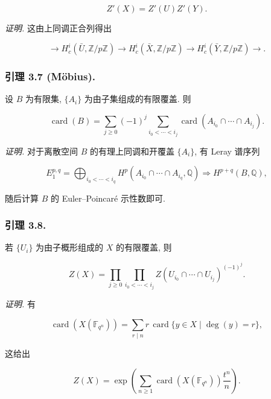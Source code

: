 \begin{equation}\tag{3.6.1}
Z'(X)=Z'(U)Z'(Y).
\end{equation}

\medskip
\noindent\emph{证明.}
这由上同调正合列得出

\begin{equation}\tag{3.6.2}
\longrightarrow H_c^i(\bar U,\mathbb Z/p\mathbb Z)
\longrightarrow H_c^i(\bar X,\mathbb Z/p\mathbb Z)
\longrightarrow H_c^i(\bar Y,\mathbb Z/p\mathbb Z)\longrightarrow.
\end{equation}

\subsubsection*{引理 3.7 (M\"obius).}
设 $B$ 为有限集, $\{A_i\}$ 为由子集组成的有限覆盖. 则

\begin{equation}\tag{3.7.1}
\operatorname{card}(B)=
\sum_{j\geq0}(-1)^j
\sum_{i_0<\cdots<i_j}
\operatorname{card}(A_{i_0}\cap\cdots\cap A_{i_j}).
\end{equation}

\medskip
\noindent\emph{证明.}
对于离散空间 $B$ 的有理上同调和开覆盖 $\{A_i\}$, 有 Leray 谱序列

\[
E_1^{p,q}=\bigoplus_{i_0<\cdots<i_q}
H^p(A_{i_0}\cap\cdots\cap A_{i_q},\mathbb Q)
\Longrightarrow H^{p+q}(B,\mathbb Q),
\]

随后计算 $B$ 的 Euler--Poincar\'e 示性数即可.

\subsubsection*{引理 3.8.}
若 $\{U_i\}$ 为由子概形组成的 $X$ 的有限覆盖, 则

\begin{equation}\tag{3.8.1}
Z(X)=
\prod_{j\geq0}
\prod_{i_0<\cdots<i_j}
Z(U_{i_0}\cap\cdots\cap U_{i_j})^{(-1)^j}.
\end{equation}

\medskip
\noindent\emph{证明.}
有

\begin{equation}\tag{3.8.2}
\operatorname{card}(X(\mathbb F_{q^n}))
=\sum_{r\mid n}r\,\operatorname{card}\{y\in X\mid\deg(y)=r\},
\end{equation}

这给出

\begin{equation}\tag{3.8.3}
Z(X)=\exp\!\left(
\sum_{n\geq1}\operatorname{card}(X(\mathbb F_{q^n}))\frac{t^n}{n}
\right).
\end{equation}

